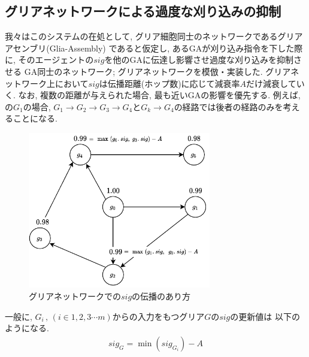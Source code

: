 \documentclass[a4paper, 10.5pt,twocolumn,dvipdfmx]{jsarticle}
\begin{document}
\subsection{グリアネットワークによる過度な刈り込みの抑制}
我々はこのシステムの在処として, グリア細胞同士のネットワークであるグリアアセンブリ(Glia-Assembly)
であると仮定し, あるGAが刈り込み指令を下した際に, 
そのエージェントの$sig$を他のGAに伝達し影響させ過度な刈り込みを抑制させる
GA同士のネットワーク; グリアネットワークを模倣・実装した.
グリアネットワーク上において$sig$は伝播距離(ホップ数)に応じて減衰率$A$だけ減衰していく.
なお, 複数の距離が与えられた場合, 最も近いGAの影響を優先する.
例えば, の$G_1$の場合, 
$G_1\rightarrow G_2\rightarrow G_3\rightarrow G_4$と$G_k\rightarrow G_4$の経路では後者の経路のみを考えることになる.
\vspace{-5mm}
\begin{figure}[H]
  \centering
  \includegraphics[width=8cm]{GliaNetworks.pdf}
  \caption{グリアネットワークでの$sig$の伝播のあり方}
  \label{fig:GliaNetworks}
\end{figure}
\vspace{-4mm}
一般に, $G_i \,,\,(i\in 1,2,3\cdots m)$からの入力をもつグリア$G$の$sig$の更新値は
以下のようになる.
\begin{align}
  sig_{G}=\min(sig_{G_i})-A
\end{align}
\end{document}
